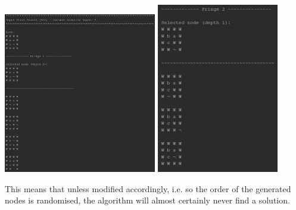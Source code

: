 \documentclass{article}
\begin{document}
	\begin{multicols}{2}[\columnsep=2cm]
		\includegraphics[width=0.5\textwidth,keepaspectratio]{DFS-1-1.png}
		\columnbreak
		\includegraphics[width=0.4\textwidth,keepaspectratio]{DFS-1-2.png}
	\end{multicols}
	
	\newpage
	This means that unless modified accordingly, i.e. so the order of the generated nodes is randomised, the algorithm will almost certainly never find a solution.
		
\end{document}
